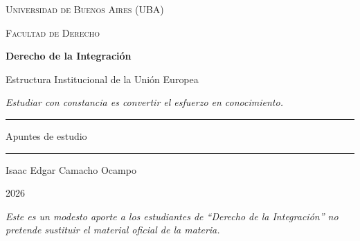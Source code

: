 \documentclass[12pt,oneside]{book}
\newcommand{\universidad}{Universidad de Buenos Aires (UBA)}
\newcommand{\facultad}{Facultad de Derecho}
\newcommand{\materia}{Derecho de la Integración}
\newcommand{\titulo}{Estructura Institucional de la Unión Europea}
\newcommand{\autor}{Isaac Edgar Camacho Ocampo}
\newcommand{\anio}{2026}
\begin{document}

\begin{titlepage}

\thispagestyle{empty}

\begin{center}

\vspace*{1cm}

{\large \textsc{\universidad}}

\vspace{0.2cm}

{\large \textsc{\facultad}}

\vspace{3cm}

{\Huge \textbf{\materia}}

\vspace{1cm}

{\LARGE \titulo}

\vspace{0.8cm}

\textit{Estudiar con constancia es convertir el esfuerzo en conocimiento.}

\vspace{1.2cm}

\rule{0.70\textwidth}{0.5pt}

\vspace{0.5cm}

{\large Apuntes de estudio}

\vspace{0.5cm}

\rule{0.70\textwidth}{0.5pt}

\vfill

{\large \autor}

\vspace{0.3cm}

{\large \anio}

\end{center}

\vfill

\begin{flushleft}
\textit{Este es un modesto aporte a los estudiantes de ``\materia'' no pretende sustituir el material oficial de la materia.}
\end{flushleft}

\end{titlepage}
\end{document}
